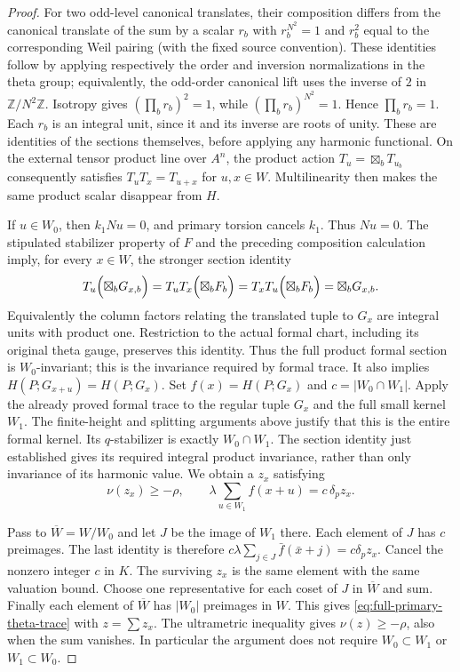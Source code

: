 \begin{proof}
For two odd-level canonical translates, their composition differs
from the canonical translate of the sum by a scalar $r_b$ with
$r_b^{N^2}=1$ and $r_b^2$ equal to the corresponding Weil pairing
(with the fixed source convention).  These identities follow by
applying respectively the order and inversion normalizations in the
theta group; equivalently, the odd-order canonical lift uses the
inverse of $2$ in $\mathbb Z/N^2\mathbb Z$.  Isotropy gives
$(\prod_b r_b)^2=1$, while $(\prod_b r_b)^{N^2}=1$.  Hence
$\prod_b r_b=1$.  Each $r_b$ is an integral unit, since it and its
inverse are roots of unity.  These are identities of the sections themselves, before applying any
harmonic functional.  On the external tensor product line over $A^n$,
the product action $T_u=\boxtimes_bT_{u_b}$ consequently satisfies
$T_uT_x=T_{u+x}$ for $u,x\in W$.  Multilinearity then makes the
same product scalar disappear from $H$.

If $u\in W_0$, then $k_1Nu=0$, and primary torsion cancels $k_1$.
Thus $Nu=0$.  The stipulated stabilizer property of $F$ and the preceding
composition calculation imply, for every $x\in W$, the stronger
section identity
\[
 T_u\Bigl(\boxtimes_bG_{x,b}\Bigr)
 =T_uT_x\Bigl(\boxtimes_bF_b\Bigr)
 =T_xT_u\Bigl(\boxtimes_bF_b\Bigr)
 =\boxtimes_bG_{x,b}.
\]
Equivalently the column factors relating the translated tuple to
$G_x$ are integral units with product one.  Restriction to the actual
formal chart, including its original theta gauge, preserves this
identity.  Thus the full product formal section is $W_0$-invariant;
this is the invariance required by formal trace.  It also implies
$H(P;G_{x+u})=H(P;G_x)$.
Set $f(x)=H(P;G_x)$ and $c=|W_0\cap W_1|$.  Apply the already proved
formal trace to the regular tuple $G_x$ and the full small kernel $W_1$.
The finite-height and splitting arguments above justify that this is
the entire formal kernel.  Its $q$-stabilizer is exactly $W_0\cap W_1$.
The section identity just established gives its required integral
product invariance, rather than only invariance of its harmonic value.  We obtain a $z_x$ satisfying
\[
 \nu(z_x)\geq-\rho,\qquad
       \lambda\sum_{u\in W_1}f(x+u)=c\,\delta_p z_x.
\]

Pass to $\overline W=W/W_0$ and let $J$ be the image of $W_1$ there.
Each element of $J$ has $c$ preimages.  The last identity is therefore
$c\lambda\sum_{j\in J}\bar f(\bar x+j)=c\delta_p z_x$.
Cancel the nonzero integer $c$ in $K$.  The surviving $z_x$ is the
same element with the same valuation bound.  Choose one representative
for each coset of $J$ in $\overline W$ and sum.  Finally each element of
$\overline W$ has $|W_0|$ preimages in $W$.  This gives
\eqref{eq:full-primary-theta-trace} with $z=\sum z_x$.
The ultrametric inequality gives $\nu(z)\geq-\rho$, also when the sum
vanishes.  In particular the argument does not require
$W_0\subset W_1$ or $W_1\subset W_0$.
\end{proof}


